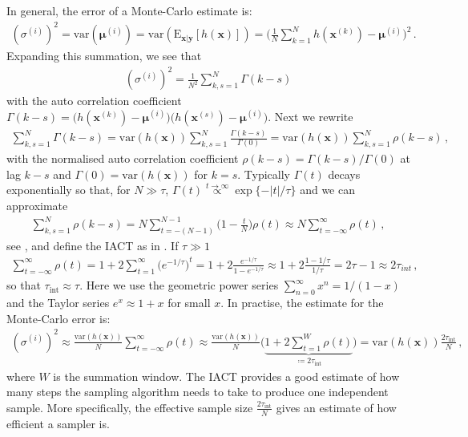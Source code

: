 In general, the error of a Monte-Carlo estimate is:
\begin{align}
	(\sigma^{(i)})^2 = \text{var}(\bm{\mu}^{(i)}) =  \text{var}(\text{E}_{\bm{x}|\bm{y}} [h(\bm{x})]) = \Bigg( \frac{1}{N} \sum_{k=1}^{N} h(\bm{x}^{(k)}) - \bm{\mu}^{(i)} \Bigg)^2 \, .
\end{align}
Expanding this summation, we see that
\begin{align}
	(\sigma^{(i)})^2 = \frac{1}{N^2} \sum_{k,s=1}^{N} \Gamma(k-s)
\end{align}
with the auto correlation coefficient $\Gamma(k-s) =  \big( h(\bm{x}^{(k)}) - \bm{\mu}^{(i)} \big) \big(h(\bm{x}^{(s)}) - \bm{\mu}^{(i)} \big)$.
Next we rewrite
\begin{align}
	\sum_{k,s=1}^{N} \Gamma(k-s) = \text{var}(h(\bm{x}))  \sum_{k,s=1}^{N} \frac{\Gamma(k-s)}{\Gamma(0)} =  \text{var}(h(\bm{x})) \sum_{k,s=1}^{N}\rho(k-s)\, ,
\end{align}
with the normalised auto correlation coefficient $\rho(k-s) =  \Gamma(k-s)/ \Gamma(0)$ at lag $k-s$ and $\Gamma(0) = \text{var}(h(\bm{x}) )$ for $k=s$.
Typically $\Gamma(t)$ decays exponentially so that, for $N\gg \tau$, $\Gamma(t) \overset{t \rightarrow \infty }{ \propto} \exp\{ - |t| / \tau \}  $ and we can approximate
\begin{align}
	\sum_{k,s=1}^{N}\rho(k-s)  = N \sum_{t = -(N-1) }^{N-1} \Bigg(1- \frac{t}{N} \Bigg) \rho(t)  \approx N  \sum_{t = - \infty }^{\infty} \rho(t) \, ,
\end{align}
see \cite[p. 137]{Sokal1997}, and define the IACT as in \cite[pp. 103-105]{wolff2002LecNot}.
If $\tau \gg 1$
\begin{align}
	\sum_{t = - \infty }^{\infty} \rho(t) =  1 + 2 \sum_{t = 1}^{\infty} \big(e^{-1/ \tau}\big)^t =  1 + 2 \frac{e^{-1/ \tau} }{1 - e^{-1/ \tau}} \approx  1 + 2 \frac{1 -1/ \tau }{1/ \tau} =  2 \tau -1 \approx 2 \tau_{int}\, ,
\end{align}
so that $\tau_{\text{int}} \approx \tau$.
Here we use the geometric power series $\sum^{\infty}_{n=0} x^n= 1/ (1-x)$ and the Taylor series $ e^x \approx 1+x$ for small $x$.
In practise, the estimate for the Monte-Carlo error is:
\begin{align}
	(\sigma^{(i)})^2   \approx \frac{\text{var}(h(\bm{x}) )}{N} \sum_{t = - \infty }^{\infty} \rho(t)
	\approx \frac{\text{var}(h(\bm{x}) )}{N} \Bigg( \underbrace{  1 + 2 \sum_{t = 1}^{W} \rho(t)  }_{ \coloneqq 	2\tau_{\text{int}} }\Bigg) = \text{var}(h(\bm{x})) \frac{ 2 \tau_{\text{int}} }{N}\, ,
\end{align}
where $W$ is the summation window.
The IACT provides a good estimate of how many steps the sampling algorithm needs to take to produce one independent sample.
More specifically, the effective sample size $\frac{ 2 \tau_{\text{int}} }{N}$ gives an estimate of how efficient a sampler is.

